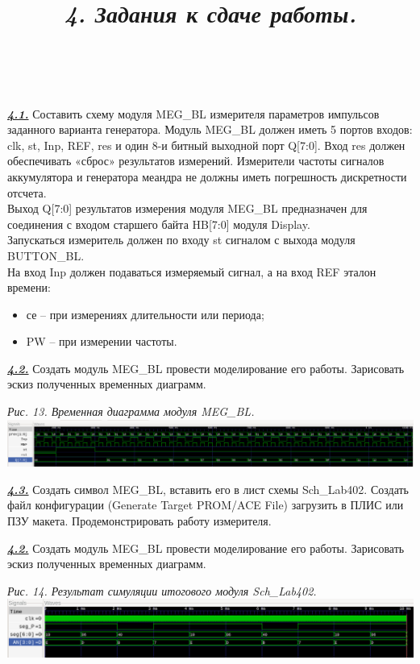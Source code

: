 \documentclass[a4paper]{article}
\begin{document}
\title{\large{\textit{4. Задания к сдаче работы.}}}\\\\

\textbf{\textit{\underline{4.1.}}} Составить схему модуля MEG\_BL измерителя параметров импульсов заданного варианта генератора. Модуль MEG\_BL должен иметь 5 портов входов: clk, st, Inp, REF, res и один 8-и битный выходной порт Q[7:0]. Вход res должен обеспечивать «сброс»
результатов измерений. Измерители частоты сигналов аккумулятора и генератора меандра не должны иметь погрешность дискретности отсчета. \\
Выход Q[7:0] результатов измерения модуля MEG\_BL предназначен для соединения с входом старшего байта HB[7:0] модуля Display. \\
Запускаться измеритель должен по входу st сигналом с выхода модуля BUTTON\_BL. \\
На вход Inp должен подаваться измеряемый сигнал, а на вход REF эталон времени:
\begin{itemize}
	\item се – при измерениях длительности или периода;
	\item PW – при измерении частоты.
\end{itemize}

\textbf{\textit{\underline{4.2.}}} Создать модуль MEG\_BL провести моделирование его работы. Зарисовать эскиз полученных временных диаграмм.
\begin{center}
	\textit{Рис. 13. Временная диаграмма модуля MEG\_BL.}
	\includegraphics[scale=0.3]{../images/MEG_BL.png}
\end{center}

\textbf{\textit{\underline{4.3.}}} Создать символ MEG\_BL, вставить его в лист схемы Sch\_Lab402. Создать файл конфигурации (Generate Target PROM/ACE File) загрузить в ПЛИС или ПЗУ макета. Продемонстрировать работу измерителя.

\textbf{\textit{\underline{4.2.}}} Создать модуль MEG\_BL провести моделирование его работы. Зарисовать эскиз полученных временных диаграмм.
\begin{center}
	\textit{Рис. 14. Результат симуляции итогового модуля Sch\_Lab402.}
	\includegraphics[scale=0.45]{../images/result.png}
\end{center}
\end{document}
